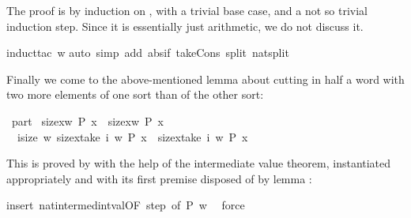 \begin{isabellebody}
\begin{isamarkuptxt}
The proof is by induction on , with a trivial base case, and a not
so trivial induction step. Since it is essentially just arithmetic, we do not
discuss it.%
\end{isamarkuptxt}%
\isamarkuptrue%
\isamarkupfalse%
{\isacharparenleft}induct{\isacharunderscore}tac\ w{\isacharparenright}\isanewline
{}\isamarkupfalse%
{\isacharparenleft}auto\ simp\ add{\isacharcolon}\ abs{\isacharunderscore}if\ take{\isacharunderscore}Cons\ split{\isacharcolon}\ nat{\isachardot}split{\isacharparenright}\isanewline
{}\isamarkupfalse%
%
\endisatagproof
{\isafoldproof}%
%
\isadelimproof
%
\endisadelimproof
%
\begin{isamarkuptext}%
Finally we come to the above-mentioned lemma about cutting in half a word with two more elements of one sort than of the other sort:%
\end{isamarkuptext}%
\isamarkuptrue%
\isamarkupfalse%
\ part{}{\isacharcolon}\isanewline
\ {\isachardoublequoteopen}size{\isacharbrackleft}x{\isasymleftarrow}w{\isachardot}\ P\ x{\isacharbrackright}\ {\isacharequal}\ size{\isacharbrackleft}x{\isasymleftarrow}w{\isachardot}\ {\isasymnot}P\ x{\isacharbrackright}{\isacharplus}{}\ {\isasymLongrightarrow}\isanewline
\ \ {\isasymexists}i{\isasymle}size\ w{\isachardot}\ size{\isacharbrackleft}x{\isasymleftarrow}take\ i\ w{\isachardot}\ P\ x{\isacharbrackright}\ {\isacharequal}\ size{\isacharbrackleft}x{\isasymleftarrow}take\ i\ w{\isachardot}\ {\isasymnot}P\ x{\isacharbrackright}{\isacharplus}{}{\isachardoublequoteclose}%
\isadelimproof
%
\endisadelimproof
%
\isatagproof
%
\begin{isamarkuptxt}%
\noindent
This is proved by  with the help of the intermediate value theorem,
instantiated appropriately and with its first premise disposed of by lemma
:%
\end{isamarkuptxt}%
\isamarkuptrue%
\isamarkupfalse%
{\isacharparenleft}insert\ nat{}{\isacharunderscore}intermed{\isacharunderscore}int{\isacharunderscore}val{\isacharbrackleft}OF\ step{}{\isacharcomma}\ of\ {\isachardoublequoteopen}P{\isachardoublequoteclose}\ {\isachardoublequoteopen}w{\isachardoublequoteclose}\ {\isachardoublequoteopen}{}{\isachardoublequoteclose}{\isacharbrackright}{\isacharparenright}\isanewline
{}\isamarkupfalse%
\ force%
\endisatagproof
{\isafoldproof}%
%
\isadelimproof
%
\endisadelimproof
%
\begin{isamarkuptext}%
\noindent


\end{isamarkuptext}
\end{isabellebody}
